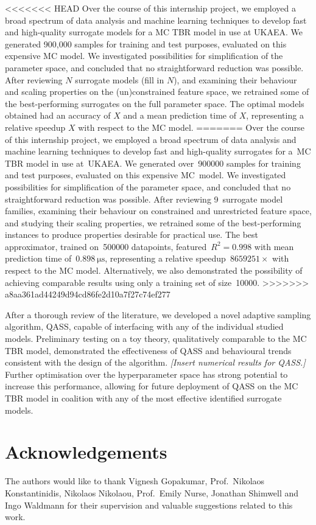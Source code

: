 <<<<<<< HEAD
Over the course of this internship project, we employed a broad spectrum of data analysis and machine learning techniques to develop fast and high-quality surrogate models for a MC TBR model in use at UKAEA. We generated 900,000 samples for training and test purposes, evaluated on this expensive MC model. We investigated possibilities for simplification of the parameter space, and concluded that no straightforward reduction was possible. After reviewing $N$ surrogate models (fill in $N$), and examining their behaviour and scaling properties on the (un)constrained feature space, we retrained some of the best-performing surrogates on the full parameter space. The optimal models obtained had an accuracy of $X$ and a mean prediction time of $X$, representing a relative speedup $X$ with respect to the MC model.
=======
Over the course of this internship project, we employed a broad spectrum of data
analysis and machine learning techniques to develop fast and high-quality
surrogates for a~MC TBR model in use at~UKAEA. We generated over~\num{900000}
samples for training and test purposes, evaluated on this expensive MC~model. We
investigated possibilities for simplification of the parameter space, and
concluded that no straightforward reduction was possible. After reviewing
9~surrogate model families, examining their behaviour on constrained and
unrestricted feature space, and studying their scaling properties, we retrained
some of the best-performing instances to produce properties desirable for
practical use. The best approximator, trained on~\num{500000} datapoints,
featured~$R^2=\num{0.998}$ with mean prediction time
of~$\SI{0.898}{\micro\second}$, representing a relative
speedup~$\num{8659251} \times$ with respect to the MC model. Alternatively, we
also demonstrated the possibility of achieving comparable results using only a
training set of size~\num{10000}.
>>>>>>> a8aa361ad44249d94cd86fe2d10a7f27c74ef277

After a thorough review of the literature, we developed a novel adaptive
sampling algorithm, QASS, capable of interfacing with any of the individual
studied models. Preliminary testing on a toy theory, qualitatively comparable to
the MC TBR model, demonstrated the effectiveness of QASS and behavioural trends
consistent with the design of the algorithm. \textit{[Insert numerical results
for QASS.]} Further optimisation over the hyperparameter space has strong
potential to increase this performance, allowing for future deployment of QASS
on the MC TBR model in coalition with any of the most effective identified
surrogate models.


\section*{Acknowledgements}

The authors would like to thank Vignesh Gopakumar, Prof.~Nikolaos
Konstantinidis, Nikolaos Nikolaou, Prof.~Emily Nurse, Jonathan Shimwell and Ingo
Waldmann for their supervision and valuable suggestions related to this work.

